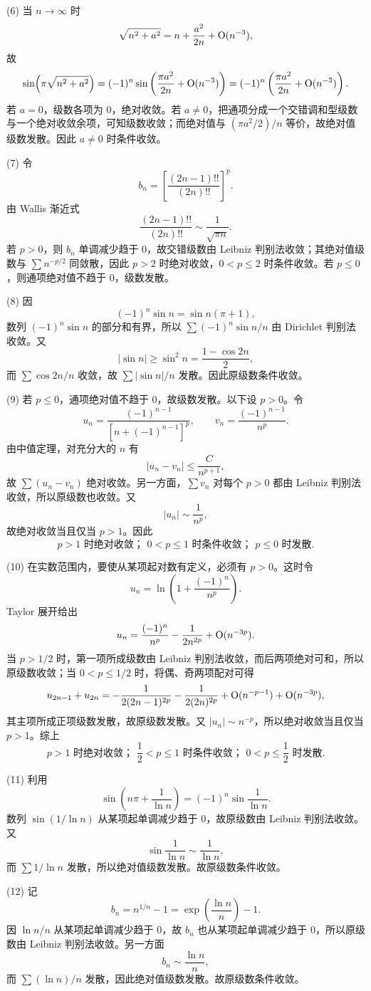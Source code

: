 \begin{xsolution}
(6) 当 $n\to\infty$ 时
\[
 \sqrt{n^2+a^2}=n+\frac{a^2}{2n}+\mathrm{O}(n^{-3}),
\]
故
\[
 \sin\!\left(\pi\sqrt{n^2+a^2}\right)
 =(-1)^n\sin\left(\frac{\pi a^2}{2n}+\mathrm{O}(n^{-3})\right)
 =(-1)^n\left(\frac{\pi a^2}{2n}+\mathrm{O}(n^{-3})\right).
\]
若 $a=0$，级数各项为 $0$，绝对收敛。若 $a\neq0$，把通项分成一个交错调和型级数与一个绝对收敛余项，可知级数收敛；而绝对值与 $(\pi a^2/2)/n$ 等价，故绝对值级数发散。因此 $a\neq0$ 时条件收敛。

(7) 令
\[
 b_n=\left[\frac{(2n-1)!!}{(2n)!!}\right]^p.
\]
由 Wallis 渐近式
\[
 \frac{(2n-1)!!}{(2n)!!}\sim\frac1{\sqrt{\pi n}}.
\]
若 $p>0$，则 $b_n$ 单调减少趋于 $0$，故交错级数由 Leibniz 判别法收敛；其绝对值级数与 $\sum n^{-p/2}$ 同敛散，因此 $p>2$ 时绝对收敛，$0<p\leq2$ 时条件收敛。若 $p\leq0$，则通项绝对值不趋于 $0$，级数发散。

(8) 因
\[
 (-1)^n\sin n=\sin n(\pi+1),
\]
数列 $(-1)^n\sin n$ 的部分和有界，所以 $\sum(-1)^n\sin n/n$ 由 Dirichlet 判别法收敛。又
\[
 |\sin n|\geq\sin^2n=\frac{1-\cos2n}{2},
\]
而 $\sum\cos2n/n$ 收敛，故 $\sum|\sin n|/n$ 发散。因此原级数条件收敛。

(9) 若 $p\leq0$，通项绝对值不趋于 $0$，故级数发散。以下设 $p>0$。令
\[
 u_n=\frac{(-1)^{n-1}}{[n+(-1)^{n-1}]^p},
 \qquad
 v_n=\frac{(-1)^{n-1}}{n^p}.
\]
由中值定理，对充分大的 $n$ 有
\[
 |u_n-v_n|\leq\frac{C}{n^{p+1}},
\]
故 $\sum(u_n-v_n)$ 绝对收敛。另一方面，$\sum v_n$ 对每个 $p>0$ 都由 Leibniz 判别法收敛，所以原级数也收敛。又
\[
 |u_n|\sim\frac1{n^p},
\]
故绝对收敛当且仅当 $p>1$。因此
\[
 \boxed{p>1\text{ 时绝对收敛； }0<p\leq1\text{ 时条件收敛； }p\leq0\text{ 时发散}.}
\]

(10) 在实数范围内，要使从某项起对数有定义，必须有 $p>0$。这时令
\[
 u_n=\ln\left(1+\frac{(-1)^n}{n^p}\right).
\]
Taylor 展开给出
\[
 u_n=\frac{(-1)^n}{n^p}-\frac1{2n^{2p}}+\mathrm{O}(n^{-3p}).
\]
当 $p>1/2$ 时，第一项所成级数由 Leibniz 判别法收敛，而后两项绝对可和，所以原级数收敛；当 $0<p\leq1/2$ 时，将偶、奇两项配对可得
\[
 u_{2n-1}+u_{2n}=-\frac1{2(2n-1)^{2p}}-\frac1{2(2n)^{2p}}+\mathrm{O}(n^{-p-1})+\mathrm{O}(n^{-3p}),
\]
其主项所成正项级数发散，故原级数发散。又 $|u_n|\sim n^{-p}$，所以绝对收敛当且仅当 $p>1$。综上
\[
 \boxed{p>1\text{ 时绝对收敛； }\frac12<p\leq1\text{ 时条件收敛； }0<p\leq\frac12\text{ 时发散}.}
\]

(11) 利用
\[
 \sin\left(n\pi+\frac1{\ln n}\right)
 =(-1)^n\sin\frac1{\ln n}.
\]
数列 $\sin(1/\ln n)$ 从某项起单调减少趋于 $0$，故原级数由 Leibniz 判别法收敛。又
\[
 \sin\frac1{\ln n}\sim\frac1{\ln n},
\]
而 $\sum1/\ln n$ 发散，所以绝对值级数发散。故原级数条件收敛。

(12) 记
\[
 b_n=n^{1/n}-1=\exp\left(\frac{\ln n}{n}\right)-1.
\]
因 $\ln n/n$ 从某项起单调减少趋于 $0$，故 $b_n$ 也从某项起单调减少趋于 $0$，所以原级数由 Leibniz 判别法收敛。另一方面
\[
 b_n\sim\frac{\ln n}{n},
\]
而 $\sum(\ln n)/n$ 发散，因此绝对值级数发散。故原级数条件收敛。
\end{xsolution}


